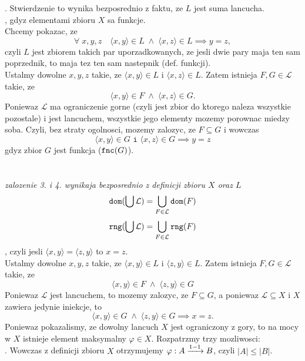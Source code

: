 \documentclass{article}
\begin{document}
    . Stwierdzenie to wynika bezposrednio z faktu, ze $L$ jest suma lancucha.\medskip\\
    , gdyz elementami zbioru $X$ sa funkcje.\smallskip\\
    Chcemy pokazac, ze
        $$\forall\;x,y,z\quad \langle x,y\rangle \in L\;\land\;\langle x,z\rangle\in L\implies y=z,$$
    czyli $L$ jest zbiorem takich par uporzadkowanych, ze jesli dwie pary maja ten sam poprzednik, to maja tez ten sam nastepnik (def. funkcji).\smallskip\\
    Ustalmy dowolne $x,y,z$ takie, ze $\langle x,y\rangle\in L$ i $\langle x,z\rangle\in L$. Zatem istnieja $F,G\in\mathcal{L}$ takie, ze
    $$\langle x,y\rangle\in F\;\land\; \langle x,z\rangle\in G.$$
    Poniewaz $\mathcal{L}$ ma {\color{acc}ograniczenie gorne} (czyli jest zbior do ktorego naleza wszystkie pozostale) i jest {\color{acc}lancuchem}, wszystkie jego elementy mozemy porownac miedzy soba. Czyli, bez straty ogolnosci, mozemy zalozyc, ze $F\subseteq G$ i wowczas
    $$\langle x,y\rangle\in G\texttt{ i }\langle x,z\rangle\in G\implies y=z$$
    gdyz zbior $G$ jest funkcja ($\texttt{fnc}(G)$).\medskip\\
    \medskip\\
    \smallskip\\
    \emph{zalozenie 3. i 4. wynikaja bezposrednio z definicji zbioru $X$ oraz $L$}
    $$\texttt{dom}(\bigcup\mathcal{L})=\bigcup\limits_{F\in\mathcal{L}}\texttt{dom}(F)$$
    $$\texttt{rng}(\bigcup\mathcal{L})=\bigcup\limits_{F\in\mathcal{L}}\texttt{rng}(F)$$
    , czyli jesli $\langle x, y\rangle=\langle z, y\rangle$ to $x=z$.\smallskip\\
    Ustalmy dowolne $x,y,z$ takie, ze $\langle x,y\rangle\in L$ i $\langle z,y\rangle\in L$. Zatem istnieja $F,G\in \mathcal{L}$ takie, ze
    $$\langle x,y\rangle\in F\;\land\;\langle z,y\rangle\in G$$
    Poniewaz $\mathcal{L}$ jest lancuchem, to mozemy zalozyc, ze $F\subseteq G$, a poniewaz $\mathcal{L}\subseteq X$ i $X$ zawiera jedynie iniekcje, to
    $$\langle x,y\rangle\in G\;\land\;\langle z,y\rangle\in G\implies x = z.$$
    Poniewaz pokazalismy, ze dowolny lancuch $X$ jest ograniczony z gory, to na mocy \color{acc}w $X$ istnieje element maksymalny $\varphi\in X$\color{txt}. Rozpatrzmy trzy mozliwosci:\medskip\\
    . Wowczas z definicji zbioru $X$ otrzymujemy $\varphi:A\xrightarrow{1-1} B$, czyli $|A|\leq|B|$. \medskip\\
\end{document}

